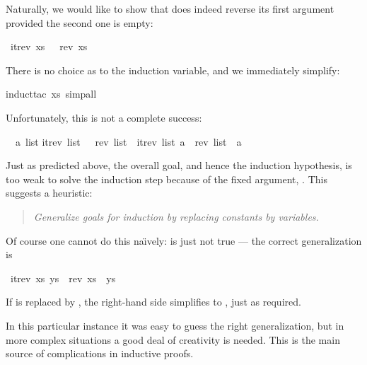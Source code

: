 \begin{isabellebody}
\begin{isamarkuptext}
Naturally, we would like to show that  does indeed reverse
its first argument provided the second one is empty:%
\end{isamarkuptext}%
\ {\isachardoublequote}itrev\ xs\ {\isacharbrackleft}{\isacharbrackright}\ {\isacharequal}\ rev\ xs{\isachardoublequote}%
\begin{isamarkuptxt}%
\noindent
There is no choice as to the induction variable, and we immediately simplify:%
\end{isamarkuptxt}%
induct{\isacharunderscore}tac\ xs{\isacharcomma}\ simp{\isacharunderscore}all{\isacharparenright}%
\begin{isamarkuptxt}%
\noindent
Unfortunately, this is not a complete success:
\begin{isabelle}%
\ {}{\isachardot}\ {\isasymAnd}a\ list{\isachardot}\isanewline
{}itrev\ list\ {\isacharbrackleft}{\isacharbrackright}\ {\isacharequal}\ rev\ list\ {\isasymLongrightarrow}\ itrev\ list\ {\isacharbrackleft}a{\isacharbrackright}\ {\isacharequal}\ rev\ list\ {\isacharat}\ {\isacharbrackleft}a{\isacharbrackright}%
\end{isabelle}
Just as predicted above, the overall goal, and hence the induction
hypothesis, is too weak to solve the induction step because of the fixed
argument, \isa{{\isacharbrackleft}{\isacharbrackright}}.  This suggests a heuristic:
\begin{quote}
\emph{Generalize goals for induction by replacing constants by variables.}
\end{quote}
Of course one cannot do this na\"{\i}vely:  is
just not true --- the correct generalization is%
\end{isamarkuptxt}%
\ {\isachardoublequote}itrev\ xs\ ys\ {\isacharequal}\ rev\ xs\ {\isacharat}\ ys{\isachardoublequote}%
\begin{isamarkuptxt}%
\noindent
If  is replaced by \isa{{\isacharbrackleft}{\isacharbrackright}}, the right-hand side simplifies to
, just as required.

In this particular instance it was easy to guess the right generalization,
but in more complex situations a good deal of creativity is needed. This is
the main source of complications in inductive proofs.


\end{isamarkuptxt}
\end{isabellebody}
